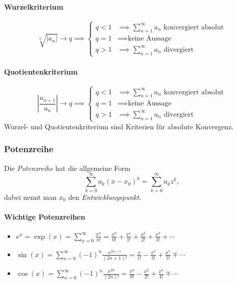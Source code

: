\documentclass[a4paper, 9pt, DIV=24]{scrartcl}
\begin{document}
\paragraph{Wurzelkriterium}
\[
  \sqrt[n]{\left | a_n \right |} \to q \implies
  \begin{cases}
    q < 1 & \implies \sum_{n=1}^\infty a_n \text{ konvergiert absolut}\\
    q = 1 & \implies \text{keine Aussage}\\
    q > 1 & \implies \sum_{n=1}^\infty a_n \text{ divergiert}
  \end{cases}
\]
\paragraph{Quotientenkriterium}
\[
\left| \frac{a_{n+1}}{a_n} \right| \to q \implies
\begin{cases}
  q < 1 & \implies \sum_{n=1}^\infty a_n \text{ konvergiert absolut} \\
  q = 1 & \implies \text{keine Aussage}\\
  q > 1 & \implies \sum_{n=1}^\infty a_n \text{ divergiert}
\end{cases}
\]
Wurzel- und Quotientenkriterium sind Kriterien für absolute Konvergenz.

\subsubsection{Potenzreihe}
Die \emph{Potenzreihe} hat die allgemeine Form \[ \sum_{k=0}^\infty a_k (x - x_0)^k = \sum_{k=0}^\infty a_k z^k, \]
dabei nennt man $x_0$ den \emph{Entwicklungspunkt}.

\paragraph{Wichtige Potenzreihen}

\begin{itemize}
 \item $ e^x = \exp(x) = \sum_{n=0}^\infty \frac{x^n}{n!} = \frac{x^0}{0!} + \frac{x^1}{1!} + \frac{x^2}{2!} + \frac{x^3}{3!} + \cdots $
\item $ \sin (x) = \sum_{n=0}^\infty (-1)^n\frac{x^{2n+1}}{(2n+1)!} = \frac{x}{1!}-\frac{x^3}{3!}+\frac{x^5}{5!}\mp\cdots $
\item $ \cos (x) = \sum_{n=0}^\infty (-1)^n\frac{x^{2n}}{(2n)!} = \frac{x^0}{0!}-\frac{x^2}{2!}+\frac{x^4}{4!}\mp\cdots $
\end{itemize}
\end{document}
